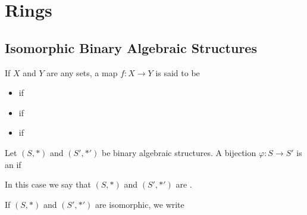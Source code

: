 \documentclass[11pt,fleqn,dvipsnames,usenames]{article}
\renewcommand{\headrulewidth}{1pt}
\newcommand{\p}{\noindent}
\begin{document}
\fancyhead[L]{\course}
\fancyhead[R]{\term}
\renewcommand{\headrulewidth}{0.4pt}


\setcounter{section}{3}
\section{Rings}
\setcounter{subsection}{1}
\subsection{Isomorphic Binary Algebraic Structures}


\recall If $X$ and $Y$ are any sets, a map $f:X\to Y$ is said to be
\vsmsp

\begin{itemize}
\item {} if
\vsp

\item {} if 
\vsp

\item {} if
\end{itemize}
\vsp

%
\begin{definition}
Let $(S,*)$ and $(S',*')$ be binary algebraic structures.  A bijection $\varphi:S\to S'$ is an  if
\vspace{2cm}

\p In this case we say that $(S,*)$ and $(S',*')$ are .
\end{definition}
\vsp

\notation If $(S,*)$ and $(S',*')$ are isomorphic, we write
\vsp
\end{document}
